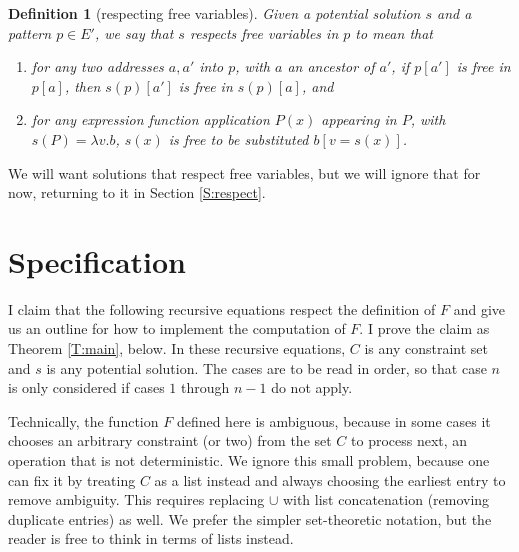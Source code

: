 \documentclass{article}
\newtheorem{dfn}{Definition}
\begin{document}
\begin{dfn}[respecting free variables]\label{D:respect}
Given a potential solution $s$ and a pattern $p\in E'$, we say that \emph{$s$ respects free variables in $p$} to mean that
\begin{enumerate}
\item	for any two addresses $a,a'$ into $p$, with $a$ an ancestor of $a'$, if $p[a']$ is free in $p[a]$, then $s(p)[a']$ is free in $s(p)[a]$, and
\item	for any expression function application $P(x)$ appearing in $P$, with $s(P)=\lambda v.b$, $s(x)$ is free to be substituted $b[v=s(x)]$.
\end{enumerate}
\end{dfn}

We will want solutions that respect free variables, but we will ignore that for now, returning to it in Section \ref{S:respect}.

\section{Specification}\label{S:spec}%

I claim that the following recursive equations respect the definition of $F$ and give us an outline for how to implement the computation of $F$.  I prove the claim as Theorem \ref{T:main}, below.  In these recursive equations, $C$ is any constraint set and $s$ is any potential solution.  The cases are to be read in order, so that case $n$ is only considered if cases $1$ through $n-1$ do not apply.

Technically, the function $F$ defined here is ambiguous, because in some cases it chooses an arbitrary constraint (or two) from the set $C$ to process next, an operation that is not deterministic.  We ignore this small problem, because one can fix it by treating $C$ as a list instead and always choosing the earliest entry to remove ambiguity.  This requires replacing $\cup$ with list concatenation (removing duplicate entries) as well.  We prefer the simpler set-theoretic notation, but the reader is free to think in terms of lists instead.
\end{document}
